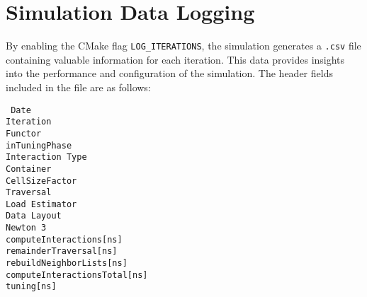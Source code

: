 










\section{Simulation Data Logging}

By enabling the CMake flag \texttt{LOG\_ITERATIONS}, the simulation generates a \texttt{.csv} file containing valuable information for each iteration. This data provides insights into the performance and configuration of the simulation. The header fields included in the file are as follows:

\begin{multicols}{2}
\raggedright
\texttt{
Date \\
Iteration \\
Functor \\
inTuningPhase \\
Interaction Type \\
Container \\
CellSizeFactor \\
Traversal \\
Load Estimator \\
Data Layout \\
Newton 3 \\
computeInteractions[ns] \\
remainderTraversal[ns] \\
rebuildNeighborLists[ns] \\
computeInteractionsTotal[ns] \\
tuning[ns]
}
\end{multicols}




